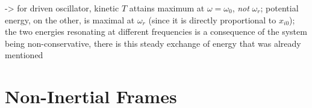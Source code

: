 \documentclass[../class_mech_main.tex]{subfiles}
\begin{document}
-> for driven oscillator, kinetic $T$ attains maximum at $\omega = \omega_0$, \emph{not} $\omega_r$; potential energy, on the other, is maximal at $\omega_r$ (since it is directly proportional to $x_{i0}$); the two energies resonating at different frequencies is a consequence of the system being non-conservative, there is this steady exchange of energy that was already mentioned



    \section{Non-Inertial Frames}\label{sec:non_inertial_frames}
% 
% 

\end{document}
